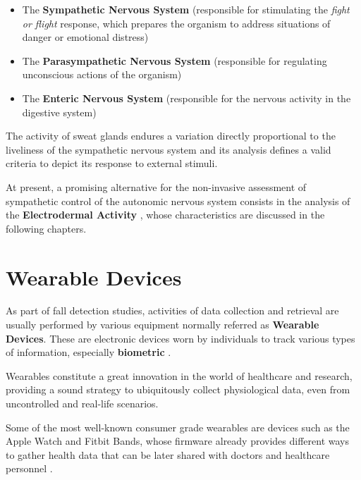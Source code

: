 \begin{itemize}
    \item The \textbf{Sympathetic Nervous System} (responsible for stimulating the \textit{fight or flight} response, which prepares the organism to address situations of danger or emotional distress)
    \item The \textbf{Parasympathetic Nervous System} (responsible for regulating unconscious actions of the organism)
    \item The \textbf{Enteric Nervous System} (responsible for the nervous activity in the digestive system)
\end{itemize}

The activity of sweat glands endures a variation directly proportional to the liveliness of the sympathetic nervous system and its analysis defines a valid criteria to depict its response to external stimuli.

At present, a promising alternative for the non-invasive assessment of sympathetic control of the autonomic nervous system consists in the analysis of the \textbf{Electrodermal Activity} \cite{edaIntro1}, whose characteristics are discussed in the following chapters.

\section{Wearable Devices}\label{sec:wearables}


As part of fall detection studies, activities of data collection and retrieval are usually performed by various equipment normally referred as \textbf{Wearable Devices}. These are electronic devices worn by individuals to track various types of information, especially \textbf{biometric} \cite{wearablesDefinition}.

Wearables constitute a great innovation in the world of healthcare and research, providing a sound strategy to ubiquitously collect physiological data, even from uncontrolled and real-life scenarios.

Some of the most well-known consumer grade wearables are devices such as the Apple Watch and Fitbit Bands, whose firmware already provides different ways to gather health data that can be later shared with doctors and healthcare personnel \cite{wearablesBest}. 

